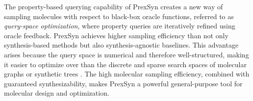 The property-based querying capability of PrexSyn creates a new way of sampling molecules with respect to black-box oracle functions, referred to as \textit{query-space optimization}, where property queries are iteratively refined using oracle feedback.
PrexSyn achieves higher sampling efficiency than not only synthesis-based methods but also synthesis-agnostic baselines.
This advantage arises because the query space is numerical and therefore well-structured, making it easier to optimize over than the discrete and sparse search spaces of molecular graphs \citep{jensen2019graph,gao2025generative} or synthetic trees \citep{swanson2024synthemol,cretu2024synflownet}.
The high molecular sampling efficiency, combined with guaranteed synthesizability, makes PrexSyn a powerful general-purpose tool for molecular design and optimization.
